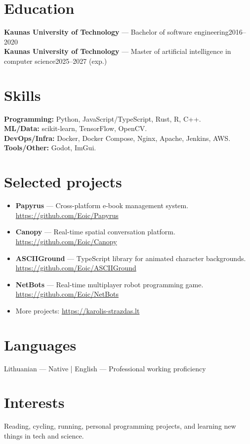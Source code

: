 \documentclass[10pt,a4paper]{article}
\newcommand{\entry}[3]{\noindent\textbf{#1} — #2\hfill #3\\}
\begin{document}
\section*{Education}
\entry{Kaunas University of Technology}{Bachelor of software engineering}{2016--2020}
\entry{Kaunas University of Technology}{Master of artificial intelligence in computer science}{2025--2027 (exp.)}
\vspace{-0.8em}

\section*{Skills}
\textbf{Programming:} Python, JavaScript/TypeScript, Rust, R, C++.\\
\textbf{ML/Data:} scikit-learn, TensorFlow, OpenCV.\\
\textbf{DevOps/Infra:} Docker, Docker Compose, Nginx, Apache, Jenkins, AWS.\\
\textbf{Tools/Other:} Godot, ImGui.

\section*{Selected projects}
\begin{itemize}[leftmargin=*,itemsep=0.08em,topsep=0.08em]
  \item \textbf{Papyrus} — Cross-platform e-book management system.\\\url{https://github.com/Eoic/Papyrus}
  \item \textbf{Canopy} — Real-time spatial conversation platform.\\\url{https://github.com/Eoic/Canopy}
  \item \textbf{ASCIIGround} — TypeScript library for animated character backgrounds.\\\url{https://github.com/Eoic/ASCIIGround}
  \item \textbf{NetBots} — Real-time multiplayer robot programming game.\\\url{https://github.com/Eoic/NetBots}
  \item More projects: \url{https://karolis-strazdas.lt}
\end{itemize}

\section*{Languages}
Lithuanian — Native \;\;|\;\; English — Professional working proficiency

\section*{Interests}
Reading, cycling, running, personal programming projects, and learning new things in tech and science.
\end{document}
